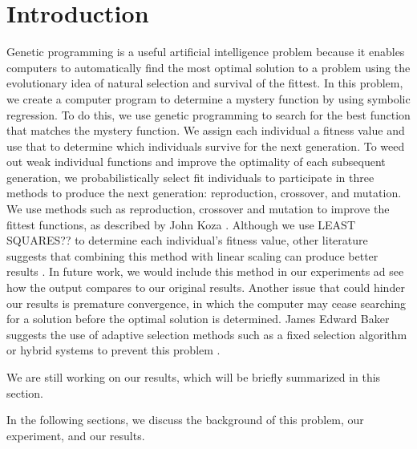 

\section{Introduction}
\label{sec:intro}



Genetic programming is a useful artificial intelligence problem because it enables computers to automatically find the most optimal solution to a problem using the evolutionary idea of natural selection and survival of the fittest.
In this problem, we create a computer program to determine a mystery
function by using symbolic regression. To do this, we use genetic programming
to search for the best function that matches the mystery function. We assign each individual a fitness value and use that to 
determine which individuals survive for the next generation. 
To weed out weak individual functions and improve the optimality of each subsequent generation, we probabilistically select fit individuals to participate in three methods to produce the next generation: reproduction, crossover, and mutation.  \\

We use methods such
as reproduction, crossover and mutation to improve the fittest functions, as described by John Koza \cite{genetic programming}. Although we use LEAST SQUARES?? to determine each individual's fitness value, other literature suggests that combining this method with linear scaling can produce better results \cite{linearscaling}. In future work, we would include this method in our experiments ad see how the output compares to our original results. Another issue that could hinder our results is premature convergence, in which the computer may cease searching for a solution before the optimal solution is determined. James Edward Baker suggests the use of adaptive selection methods such as a fixed selection algorithm or hybrid systems to prevent this problem \cite{selectionmethods}. 

We are still working on our results, which will be briefly summarized in this section. 

In the following sections, we discuss the background of this problem, our experiment, and our results. 



